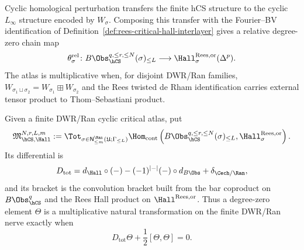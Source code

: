 \begin{definition}
Cyclic homological perturbation transfers the finite hCS structure to
the cyclic $L_\infty$ structure encoded by $W_\sigma$. Composing this
transfer with the Fourier--BV identification of
Definition~\ref{def:rees-critical-hall-interlayer} gives a relative
degree-zero chain map
\[
 \theta_\sigma^{\mathrm{rel}}\colon
 B\Obs_{\hCS}^{q,\leq r,\leq N}(\sigma)_{\leq L}
 \longrightarrow
 \Hall_{\sigma}^{\mathrm{Rees},\mathrm{or}}(\Delta^p).
\]
The atlas is multiplicative when, for disjoint DWR/Ran families,
$W_{\sigma_1\sqcup\sigma_2}=W_{\sigma_1}\boxplus W_{\sigma_2}$ and the
Rees twisted de Rham identification carries external tensor product to
Thom--Sebastiani product.
\end{definition}

\begin{definition}
\label{def:finite-hcs-rees-hall-convolution-lie-algebra}
Given a finite DWR/Ran cyclic critical atlas, put
\[
 \mathfrak M_{\hCS,\Hall}^{N,r,L,m}
 :=
 \Tot_{\sigma\in\mathsf N^{\Ran}_{\leq m}(\mathfrak U;\Gamma_{\leq L})}
 \Hom_{\mathrm{cont}}
 \left(
 B\Obs_{\hCS}^{q,\leq r,\leq N}(\sigma)_{\leq L},
 \Hall_{\sigma}^{\mathrm{Rees},\mathrm{or}}
 \right).
\]
Its differential is
\[
 D_{\mathrm{tot}}
 =
 d_{\Hall}\circ(-)
 -(-1)^{|-|}(-)\circ d_{B\Obs}
 +\delta_{\Cech/\Ran},
\]
and its bracket is the convolution bracket built from the bar
coproduct on $B\Obs_{\hCS}^{q}$ and the Rees Hall product on
$\Hall^{\mathrm{Rees},\mathrm{or}}$. Thus a degree-zero element
$\Theta$ is a multiplicative natural transformation on the finite
DWR/Ran nerve exactly when
\[
 D_{\mathrm{tot}}\Theta+\frac{1}{2}[\Theta,\Theta]=0.
\]
\end{definition}

